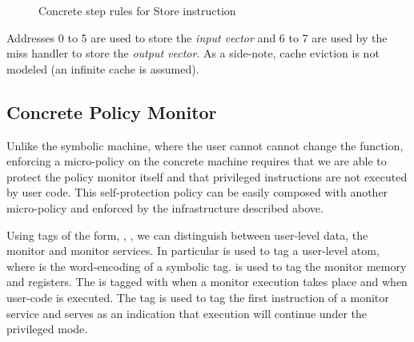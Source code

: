 \begin{figure}[htb]
\bigskip
{}
\caption{Concrete step rules for Store instruction}
\label{cstep_store}
\end{figure}

Addresses 0 to 5 are used to store the \emph{input vector} and 6 to 7 are used
by the miss handler to store the \emph{output vector}. As a side-note, cache
eviction is not modeled (an infinite cache is assumed).

\subsection{Concrete Policy Monitor}\label{sec:concrete_policy}

Unlike the symbolic machine, where the user cannot cannot change the
\TRANSFER function, enforcing a micro-policy on the concrete machine requires
that we are able to protect the policy monitor itself and that privileged
instructions are not executed by user code. This self-protection policy can be
easily composed with another micro-policy and enforced by the infrastructure
described above.

Using tags of the form, , , \MONITOR we can
distinguish between user-level data, the monitor and monitor services.
In particular  is used to tag a user-level atom, where  is
the word-encoding of a symbolic tag. \MONITOR is used to tag the monitor memory
and registers. The \pc is tagged with \MONITOR when a monitor
execution takes place and  when user-code is executed. The tag
 is used to tag the first instruction of a monitor service and
serves as an indication that execution will continue under the privileged
\MONITOR mode.

